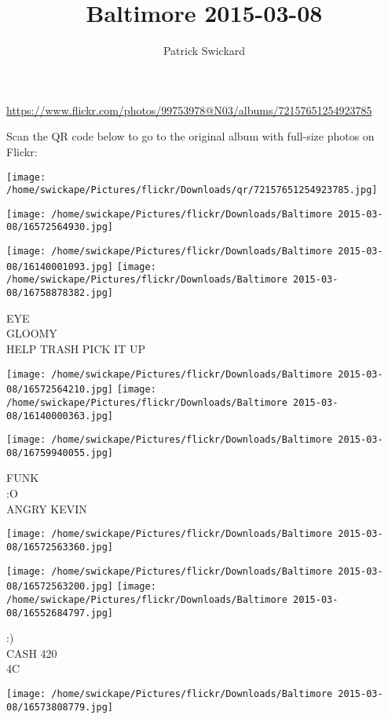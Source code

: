\documentclass[10pt,letterpaper]{article}
\title{Baltimore 2015-03-08}
\author{Patrick Swickard}
\date{}
\begin{document}
\maketitle

\url{https://www.flickr.com/photos/99753978@N03/albums/72157651254923785}

Scan the QR code below to go to the original album with full-size photos on Flickr:

\texttt{[image: /home/swickape/Pictures/flickr/Downloads/qr/72157651254923785.jpg]}
\pagebreak

\texttt{[image: /home/swickape/Pictures/flickr/Downloads/Baltimore 2015-03-08/16572564930.jpg]}

\vspace{0.25in}
\texttt{[image: /home/swickape/Pictures/flickr/Downloads/Baltimore 2015-03-08/16140001093.jpg]}
\texttt{[image: /home/swickape/Pictures/flickr/Downloads/Baltimore 2015-03-08/16758878382.jpg]}

EYE\\
GLOOMY\\
HELP TRASH PICK IT UP
\pagebreak

\texttt{[image: /home/swickape/Pictures/flickr/Downloads/Baltimore 2015-03-08/16572564210.jpg]}
\texttt{[image: /home/swickape/Pictures/flickr/Downloads/Baltimore 2015-03-08/16140000363.jpg]}

\texttt{[image: /home/swickape/Pictures/flickr/Downloads/Baltimore 2015-03-08/16759940055.jpg]}

FUNK\\
:O\\
ANGRY KEVIN
\pagebreak

\texttt{[image: /home/swickape/Pictures/flickr/Downloads/Baltimore 2015-03-08/16572563360.jpg]}

\vspace{0.25in}
\texttt{[image: /home/swickape/Pictures/flickr/Downloads/Baltimore 2015-03-08/16572563200.jpg]}
\texttt{[image: /home/swickape/Pictures/flickr/Downloads/Baltimore 2015-03-08/16552684797.jpg]}

:)\\
CASH 420\\
4C
\pagebreak

\texttt{[image: /home/swickape/Pictures/flickr/Downloads/Baltimore 2015-03-08/16573808779.jpg]}
\end{document}
